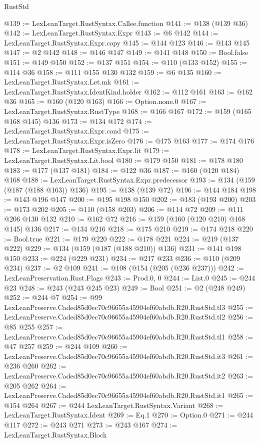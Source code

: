\begin{lexlean}{RustStd}
\begin{coremodule}
@139 := LexLeanTarget.RustSyntax.Callee.function
@141 := @138 (@139 @36)
@142 := LexLeanTarget.RustSyntax.Expr
@143 := @6 @142
@144 := LexLeanTarget.RustSyntax.Expr.copy
@145 := @144 @123
@146 := @143 @145
@147 := @2 @142
@148 := @146 @147
@149 := @141 @148
@150 := Bool.false
@151 := @149 @150
@152 := @137 @151
@154 := @110 (@133 @152)
@155 := @114 @36
@158 := @111 @155 @130 @132
@159 := @6 @135
@160 := LexLeanTarget.RustSyntax.Let.mk
@161 := LexLeanTarget.RustSyntax.IdentKind.holder
@162 := @112 @161
@163 := @162 @36
@165 := @160 (@120 @163)
@166 := Option.none.{0}
@167 := LexLeanTarget.RustSyntax.RustType
@168 := @166 @167
@172 := @159 (@165 @168 @145) @136
@173 := @134 @172
@174 := LexLeanTarget.RustSyntax.Expr.cond
@175 := LexLeanTarget.RustSyntax.Expr.isZero
@176 := @175 @163
@177 := @174 @176
@178 := LexLeanTarget.RustSyntax.Expr.lit
@179 := LexLeanTarget.RustSyntax.Lit.bool
@180 := @179 @150
@181 := @178 @180
@183 := @177 (@137 @181)
@184 := @122 @36
@187 := @160 (@120 @184) @168
@188 := LexLeanTarget.RustSyntax.Expr.predecessor
@193 := @134 (@159 (@187 (@188 @163)) @136)
@195 := @138 (@139 @72)
@196 := @144 @184
@198 := @143 @196 @147
@200 := @195 @198 @150
@202 := @183 (@193 @200)
@203 := @173 @202
@205 := @110 (@158 @203)
@206 := @114 @72
@209 := @111 @206 @130 @132
@210 := @162 @72
@216 := @159 (@160 (@120 @210) @168 @145) @136
@217 := @134 @216
@218 := @175 @210
@219 := @174 @218
@220 := Bool.true
@221 := @179 @220
@222 := @178 @221
@224 := @219 (@137 @222)
@229 := @134 (@159 (@187 (@188 @210)) @136)
@231 := @141 @198 @150
@233 := @224 (@229 @231)
@234 := @217 @233
@236 := @110 (@209 @234)
@237 := @2 @109
@241 := @108 (@154 (@205 (@236 @237)))
@242 := LexLeanPreservation.Rust.Flags
@243 := Prod.{0, 0}
@244 := List.{0}
@245 := @244 @23
@248 := @243 (@243 @245 @23)
@249 := Bool
@251 := @2 (@248 @249)
@252 := @244 @7
@254 := @99 LexLeanPreserve.Caded85d0ec70c96655a45904ef60abdb.R20.RustStd.tl3
@255 := LexLeanPreserve.Caded85d0ec70c96655a45904ef60abdb.R20.RustStd.tl2
@256 := @85 @255
@257 := LexLeanPreserve.Caded85d0ec70c96655a45904ef60abdb.R20.RustStd.tl1
@258 := @47 @257
@259 := @244 @109
@260 := LexLeanPreserve.Caded85d0ec70c96655a45904ef60abdb.R20.RustStd.it3
@261 := @236 @260
@262 := LexLeanPreserve.Caded85d0ec70c96655a45904ef60abdb.R20.RustStd.it2
@263 := @205 @262
@264 := LexLeanPreserve.Caded85d0ec70c96655a45904ef60abdb.R20.RustStd.it1
@265 := @154 @264
@267 := @244 LexLeanTarget.RustSyntax.Variant
@268 := LexLeanTarget.RustSyntax.Ident
@269 := Eq.{1}
@270 := Option.{0}
@271 := @244 @117
@272 := @243 @271
@273 := @243 @167
@274 := LexLeanTarget.RustSyntax.Block

\end{coremodule}
\end{lexlean}
